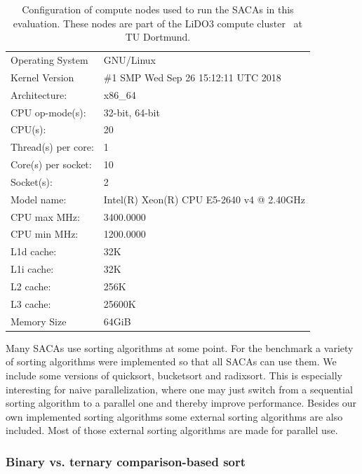 \begin{table}[!t]
    \centering
    \begin{tabular}{ll}
        \toprule
        Operating System     & GNU/Linux \\
        Kernel Version       & \#1 SMP Wed Sep 26 15:12:11 UTC 2018 \\
        \midrule
        Architecture:        & x86\_64 \\
        CPU op-mode(s):      & 32-bit, 64-bit \\
        CPU(s):              & 20 \\
        Thread(s) per core:  & 1 \\
        Core(s) per socket:  & 10 \\
        Socket(s):           & 2 \\
        Model name:          & Intel(R) Xeon(R) CPU E5-2640 v4 @ 2.40GHz \\
        CPU max MHz:         & 3400.0000 \\
        CPU min MHz:         & 1200.0000 \\
        L1d cache:           & 32K \\
        L1i cache:           & 32K \\
        L2 cache:            & 256K \\
        L3 cache:            & 25600K \\
        \midrule
        Memory Size          & 64GiB \\
        \bottomrule
    \end{tabular}
    \caption{Configuration of compute nodes used to run the SACAs in this evaluation. These nodes are part of the LiDO3 compute cluster~\cite{lido3} at TU Dortmund.}
    \label{ea:lido}
\end{table}

Many SACAs use sorting algorithms at some point. For the benchmark a variety of sorting algorithms were implemented so that all SACAs can use them.
We include some versions of quicksort, bucketsort and radixsort.
This is especially interesting for naive parallelization, where one may just switch from a sequential sorting algorithm to a parallel one
and thereby improve performance.
Besides our own implemented sorting algorithms some external sorting algorithms are also included.
Most of those external sorting algorithms are made for parallel use.

\subsubsection{Binary vs. ternary comparison-based sort}

